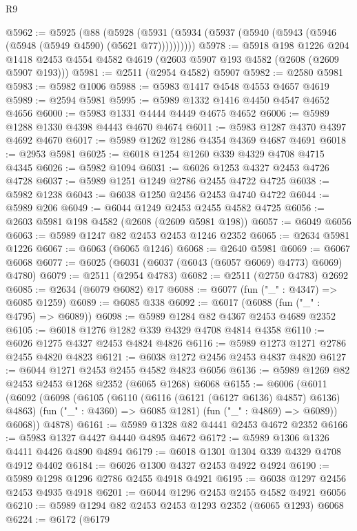 \begin{lexlean}{R9}
\begin{coremodule}
@5962 := @5925
    (@88 (@5928 (@5931 (@5934 (@5937 (@5940 (@5943 (@5946 (@5948 (@5949 @4590) (@5621 @77))))))))))
@5978 := @5918
    @198
    @1226
    @204
    @1418
    @2453
    @4554
    @4582
    @4619
    (@2603 @5907 @193 @4582 (@2608 (@2609 @5907 @193)))
@5981 := @2511 (@2954 @4582) @5907
@5982 := @2580 @5981
@5983 := @5982 @1006
@5988 := @5983 @1417 @4548 @4553 @4657 @4619
@5989 := @2594 @5981
@5995 := @5989 @1332 @1416 @4450 @4547 @4652 @4656
@6000 := @5983 @1331 @4444 @4449 @4675 @4652
@6006 := @5989 @1288 @1330 @4398 @4443 @4670 @4674
@6011 := @5983 @1287 @4370 @4397 @4692 @4670
@6017 := @5989 @1262 @1286 @4354 @4369 @4687 @4691
@6018 := @2953 @5981
@6025 := @6018 @1254 @1260 @339 @4329 @4708 @4715 @4345
@6026 := @5982 @1094
@6031 := @6026 @1253 @4327 @2453 @4726 @4728
@6037 := @5989 @1251 @1249 @2786 @2455 @4722 @4725
@6038 := @5982 @1238
@6043 := @6038 @1250 @2456 @2453 @4740 @4722
@6044 := @5989 @206
@6049 := @6044 @1249 @2453 @2455 @4582 @4725
@6056 := @2603 @5981 @198 @4582 (@2608 (@2609 @5981 @198))
@6057 := @6049 @6056
@6063 := @5989 @1247 @82 @2453 @2453 @1246 @2352
@6065 := @2634 @5981 @1226
@6067 := @6063 (@6065 @1246)
@6068 := @2640 @5981
@6069 := @6067 @6068
@6077 := @6025 (@6031 (@6037 (@6043 (@6057 @6069) @4773) @6069) @4780)
@6079 := @2511 (@2954 @4783)
@6082 := @2511 (@2750 @4783) @2692
@6085 := @2634 (@6079 @6082) @17
@6088 := @6077 (fun ("_" : @4347) => @6085 @1259)
@6089 := @6085 @338
@6092 := @6017 (@6088 (fun ("_" : @4795) => @6089))
@6098 := @5989 @1284 @82 @4367 @2453 @4689 @2352
@6105 := @6018 @1276 @1282 @339 @4329 @4708 @4814 @4358
@6110 := @6026 @1275 @4327 @2453 @4824 @4826
@6116 := @5989 @1273 @1271 @2786 @2455 @4820 @4823
@6121 := @6038 @1272 @2456 @2453 @4837 @4820
@6127 := @6044 @1271 @2453 @2455 @4582 @4823 @6056
@6136 := @5989 @1269 @82 @2453 @2453 @1268 @2352 (@6065 @1268) @6068
@6155 := @6006
    (@6011
      (@6092
        (@6098
          (@6105
            (@6110 (@6116 (@6121 (@6127 @6136) @4857) @6136) @4863)
            (fun ("_" : @4360) => @6085 @1281)
            (fun ("_" : @4869) => @6089))
          @6068))
      @4878)
@6161 := @5989 @1328 @82 @4441 @2453 @4672 @2352
@6166 := @5983 @1327 @4427 @4440 @4895 @4672
@6172 := @5989 @1306 @1326 @4411 @4426 @4890 @4894
@6179 := @6018 @1301 @1304 @339 @4329 @4708 @4912 @4402
@6184 := @6026 @1300 @4327 @2453 @4922 @4924
@6190 := @5989 @1298 @1296 @2786 @2455 @4918 @4921
@6195 := @6038 @1297 @2456 @2453 @4935 @4918
@6201 := @6044 @1296 @2453 @2455 @4582 @4921 @6056
@6210 := @5989 @1294 @82 @2453 @2453 @1293 @2352 (@6065 @1293) @6068
@6224 := @6172
    (@6179

\end{coremodule}
\end{lexlean}
